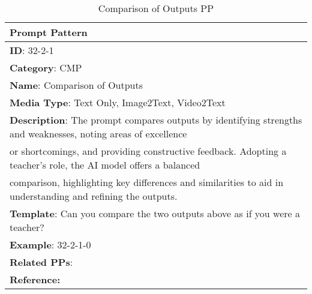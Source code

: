 \begin{table}[h!]
\fontsize{9pt}{10pt}\selectfont
\centering
\caption{Comparison of Outputs PP}
\label{tab:Comparison_of_Outputs_PP}
\begin{tabular}{|l|}
    \hline
    \textbf{Prompt Pattern} \\ \hline
    \textbf{ID}: 32-2-1\\ 
    \textbf{Category}: CMP\\ 
    \textbf{Name}: Comparison of Outputs\\ 
    \textbf{Media Type}: Text Only, Image2Text, Video2Text\\ 
    \textbf{Description}: The prompt compares outputs by identifying strengths and weaknesses, noting areas of excellence\\ or shortcomings, and providing constructive feedback. Adopting a teacher's role, the AI model offers a balanced\\ comparison, highlighting key differences and similarities to aid in understanding and refining the outputs. \\
    \textbf{Template}: Can you compare the two outputs above as if you were a teacher?\\
    \textbf{Example}: 32-2-1-0\\ 
    \textbf{Related PPs}: \\ 
    \textbf{Reference:} \cite{Bubeck2023SparksGPT-4}\\ \hline
\end{tabular}
\end{table}
            

